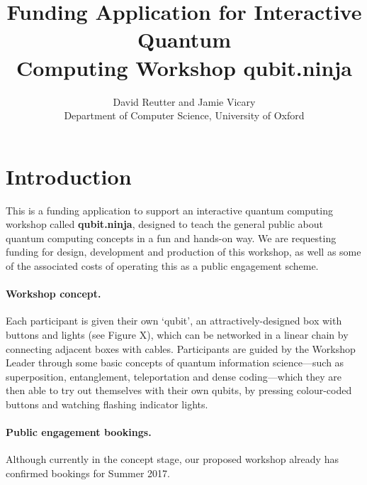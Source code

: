 \documentclass[a4paper, 12pt]{article}
\begin{document}
\title{Funding Application for Interactive Quantum\\Computing Workshop \textbf{qubit.ninja}}
\author{David Reutter and Jamie Vicary
\\
Department of Computer Science, University of Oxford}
\maketitle

\section*{Introduction}

This is a funding application to support an interactive quantum computing workshop called \textbf{qubit.ninja}, designed to teach the general public about quantum computing concepts in a fun and hands-on way. We are requesting funding for design, development and production of this workshop, as well as some of the associated costs of operating this as a public engagement scheme.

\paragraph{Workshop concept.}
Each participant is given their own `qubit', an attractively-designed box with buttons and lights (see Figure X), which can be networked in a linear chain by connecting adjacent boxes with cables. Participants are guided by the Workshop Leader through some basic concepts of quantum information science---such as superposition, entanglement, teleportation and dense coding---which they are then able to try out themselves with their own qubits, by pressing colour-coded buttons and watching flashing indicator lights.

\paragraph{Public engagement bookings.}
Although currently in the concept stage, our proposed workshop already has confirmed bookings for Summer 2017.
\end{document}
